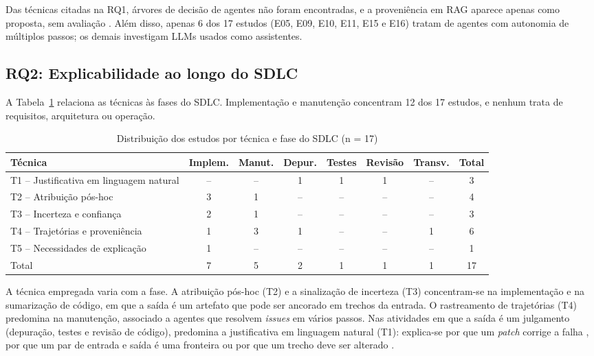 \documentclass[12pt]{article}
\begin{document}
Das técnicas citadas na RQ1, árvores de decisão de agentes não foram
encontradas, e a proveniência em RAG aparece apenas como proposta, sem
avaliação \cite{wang2025}. Além disso, apenas 6 dos 17 estudos (E05, E09, E10,
E11, E15 e E16) tratam de agentes com autonomia de múltiplos passos; os demais
investigam LLMs usados como assistentes.

\subsection{RQ2: Explicabilidade ao longo do SDLC}

A Tabela~\ref{tab:fases} relaciona as técnicas às fases do SDLC. Implementação
e manutenção concentram 12 dos 17 estudos, e nenhum trata de requisitos,
arquitetura ou operação.

\begin{table}[ht]
\centering
\caption{Distribuição dos estudos por técnica e fase do SDLC (n = 17)}\label{tab:fases}
\footnotesize\setlength{\tabcolsep}{4pt}
\begin{tabular}{lccccccc}
\toprule
Técnica & Implem. & Manut. & Depur. & Testes & Revisão & Transv. & Total \\
\midrule
T1 -- Justificativa em linguagem natural & -- & -- & 1 & 1 & 1 & -- & 3 \\
T2 -- Atribuição pós-hoc & 3 & 1 & -- & -- & -- & -- & 4 \\
T3 -- Incerteza e confiança & 2 & 1 & -- & -- & -- & -- & 3 \\
T4 -- Trajetórias e proveniência & 1 & 3 & 1 & -- & -- & 1 & 6 \\
T5 -- Necessidades de explicação & 1 & -- & -- & -- & -- & -- & 1 \\
\midrule
Total & 7 & 5 & 2 & 1 & 1 & 1 & 17 \\
\bottomrule
\end{tabular}
\end{table}

A técnica empregada varia com a fase. A atribuição pós-hoc (T2) e a sinalização
de incerteza (T3) concentram-se na implementação e na sumarização de código, em
que a saída é um artefato que pode ser ancorado em trechos da entrada. O
rastreamento de trajetórias (T4) predomina na manutenção, associado a agentes
que resolvem \textit{issues} em vários passos. Nas atividades em que a saída é
um julgamento (depuração, testes e revisão de código), predomina a
justificativa em linguagem natural (T1): explica-se por que um \textit{patch}
corrige a falha \cite{kang2025}, por que um par de entrada e saída é uma
fronteira \cite{akbarova2026} ou por que um trecho deve ser alterado
\cite{gao2026}.
\end{document}
